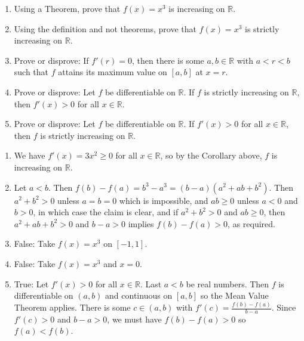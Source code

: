 \documentclass[12pt]{amsart}
\newcommand{\R}{{\mathbb{R}}}
\numberwithin{equation}{section}
\theoremstyle{plain} %
\theoremstyle{definition}
\theoremstyle{remark}
\begin{document}
\begin{enumerate}
\item Using a Theorem, prove that $f(x)  = x^3$ is increasing on $\R$.

\item Using the definition and not theorems, prove that $f(x)  = x^3$ is strictly increasing on $\R$.

\item Prove or disprove: If $f'(r)=0$, then there is some $a,b\in \R$ with $a<r<b$ such that $f$ attains its maximum value on $[a,b]$ at $x=r$.

\item Prove or disprove: Let $f$ be differentiable on $\R$. If $f$ is strictly increasing on $\R$, then $f'(x)>0$ for all $x\in \R$.

\item Prove or disprove: Let $f$ be differentiable on $\R$. If $f'(x)>0$ for all $x\in \R$, then $f$ is strictly increasing on $\R$.

\end{enumerate}

\begin{framed}
\begin{enumerate}
\item We have $f'(x) = 3x^2 \geq 0$ for all $x\in \R$, so by the Corollary above, $f$ is increasing on $\R$.

\item Let $a<b$. Then $f(b) - f(a) = b^3 -a^3 = (b-a)(a^2+ab+b^2)$. Then $a^2+b^2 > 0$ unless $a=b=0$ which is impossible, and $ab\geq 0$ unless $a<0$ and $b>0$, in which case the claim is clear, and if $a^2+b^2 >0$ and $ab\geq 0$, then $a^2+ab+b^2>0$ and $b-a>0$ implies $f(b)-f(a)>0$, as required.

\item False: Take $f(x) = x^3$ on $[-1,1]$.

\item False: Take $f(x)=x^3$ and $x=0$.

\item True: Let $f'(x)>0$ for all $x\in \R$. Last $a<b$ be real numbers. Then $f$ is differentiable on $(a,b)$ and continuous on $[a,b]$ so the Mean Value Theorem applies. There is some $c\in (a,b)$ with $f'(c) = \frac{f(b)- f(a)}{b-a}$. Since $f'(c)>0$ and $b-a>0$, we must have $f(b)-f(a)>0$ so $f(a)<f(b)$.
\end{enumerate}
\end{framed}

\printindex
\end{document}

